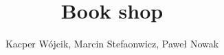 \documentclass[]{article}
\title{Book shop}
\author{Kacper Wójcik, Marcin Stefaonwicz, Paweł Nowak}
\begin{document}
\maketitle

\begin{abstract}

\end{abstract}

\end{document}

